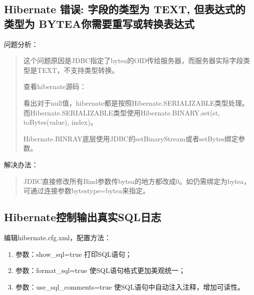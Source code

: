 \documentclass[a4,10pt,oneside,english]{sphinxmanual}
\begin{document}
\subsection{Hibernate 错误: 字段的类型为 TEXT, 但表达式的类型为 BYTEA你需要重写或转换表达式}
\label{\detokenize{interface/hibernate:hibernate-text-bytea}}
问题分析：
\begin{quote}

这个问题原因是JDBC指定了bytea的OID传给服务器，而服务器实际字段类型是TEXT，不支持类型转换。

查看hibernate源码：

\begin{sphinxVerbatim}[commandchars=\\\{\}]
           
          
             
\end{sphinxVerbatim}

看出对于null值，hibernate都是按照Hibernate.SERIALIZABLE类型处理。而Hibernate.SERIALIZABLE类型使用Hibernate.BINARY.set(st, toBytes(value), index)。

Hibernate.BINRAY底层使用JDBC的setBinaryStream或者setBytes绑定参数。
\end{quote}

解决办法：
\begin{quote}

JDBC直接修改所有Bind参数传bytea的地方都改成0。如仍需绑定为bytea，可通过连接参数bytestype=bytea来指定。
\end{quote}


\subsection{Hibernate控制输出真实SQL日志}
\label{\detokenize{interface/hibernate:hibernatesql}}
编辑hibernate.cfg.xml，配置方法：
\begin{enumerate}
%
\item {} 
参数：show\_sql=true 打印SQL语句；

\item {} 
参数：format\_sql=true 使SQL语句格式更加美观统一；

\item {} 
参数：use\_sql\_comments=true 使SQL语句中自动注入注释，增加可读性。

\end{enumerate}
\end{document}
